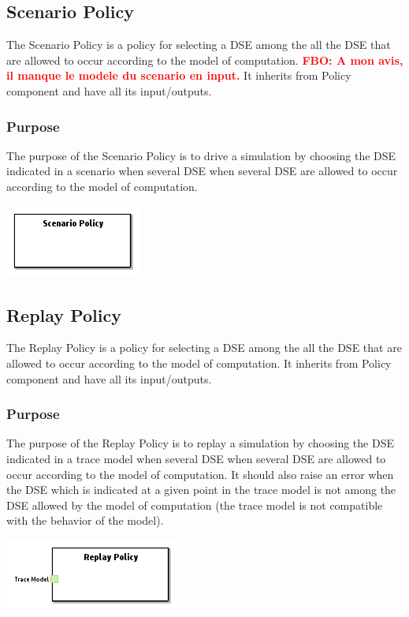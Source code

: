 \documentclass{gemoc} %
\begin{document}
\subsection{Scenario Policy}
The Scenario Policy is a policy for selecting a DSE among the all the DSE that are allowed to occur according to the model of computation.
\textcolor{red}{\textbf{FBO: A mon avis, il manque le modele du scenario en input.}}
It inherits from Policy component and have all its input/outputs.

\subsubsection{Purpose}
The purpose of the Scenario Policy is to drive a simulation by choosing the DSE indicated in a scenario when several DSE when several DSE are allowed to occur according to the model of computation.
\begin{center}
\includegraphics*[trim=0.0cm 0.0cm 0cm 0.0cm, clip=true]{../images/generated/Generated_Scenario_Policy.png}
\end{center}



\subsection{Replay Policy}
The Replay Policy is a policy for selecting a DSE among the all the DSE that are allowed to occur according to the model of computation.
It inherits from Policy component and have all its input/outputs.

\subsubsection{Purpose}
The purpose of the Replay Policy is to replay a simulation by choosing the DSE indicated in a trace model when several DSE when several DSE are allowed to occur according to the model of computation. It should also raise an error when the DSE which is indicated at a given point in the trace model is not among the DSE allowed by the model of computation (the trace model is not compatible with the behavior of the model).
\begin{center}
\includegraphics*[trim=0.0cm 0.0cm 0cm 0.0cm, clip=true]{../images/generated/Generated_Replay_Policy.png}
\end{center}
\end{document}
